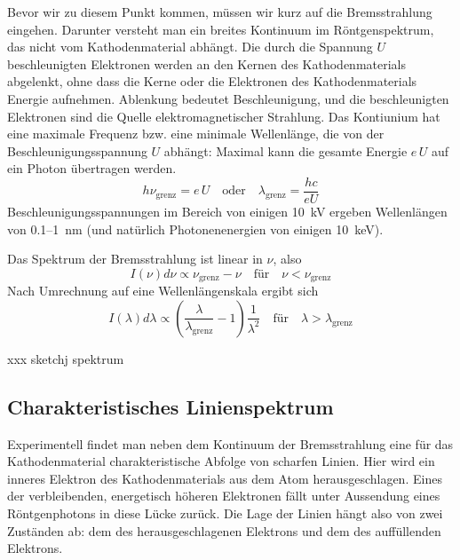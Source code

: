 Bevor wir zu diesem Punkt kommen, müssen wir kurz auf die Bremsstrahlung eingehen. Darunter versteht man ein breites Kontinuum im Röntgenspektrum,  das nicht vom Kathodenmaterial abhängt. Die durch die Spannung $U$ beschleunigten Elektronen werden an den Kernen des Kathodenmaterials abgelenkt, ohne dass die Kerne oder die Elektronen des Kathodenmaterials Energie aufnehmen. Ablenkung bedeutet Beschleunigung, und die beschleunigten Elektronen sind die Quelle  elektromagnetischer Strahlung.  Das Kontiunium hat eine maximale Frequenz bzw. eine minimale Wellenlänge, die von der Beschleunigungsspannung $U$ abhängt: Maximal kann die gesamte Energie $e \, U$ auf ein Photon übertragen werden.
\begin{equation}
    h \nu_\text{grenz} = e \, U \quad \text{oder} \quad
    \lambda_\text{grenz} = \frac{h c}{e U}
\end{equation}
Beschleunigungsspannungen im Bereich von einigen 10~kV ergeben Wellenlängen von 0.1--1~nm (und natürlich Photonenenergien von einigen 10~keV).

Das Spektrum der Bremsstrahlung ist linear in $\nu$, also 
\begin{equation}
    I(\nu) d\nu \propto \nu_\text{grenz} - \nu \quad \text{für} \quad  \nu < \nu_\text{grenz}
\end{equation}
Nach Umrechnung auf eine Wellenlängenskala ergibt sich
\begin{equation}
    I(\lambda) d\lambda \propto \left( \frac{\lambda}{\lambda_\text{grenz}} - 1 \right) \frac{1}{\lambda^2} 
    \quad \text{für} \quad  \lambda > \lambda_\text{grenz}
\end{equation}

xxx sketchj spektrum


\subsection{Charakteristisches Linienspektrum}
Experimentell findet man neben dem Kontinuum der Bremsstrahlung eine für das Kathodenmaterial charakteristische Abfolge von scharfen Linien. Hier wird ein inneres Elektron des Kathodenmaterials aus dem Atom herausgeschlagen. Eines der verbleibenden, energetisch höheren Elektronen fällt unter Aussendung eines Röntgenphotons in diese Lücke zurück. Die Lage der Linien hängt also von zwei Zuständen ab: dem des herausgeschlagenen Elektrons und dem des auffüllenden Elektrons.

